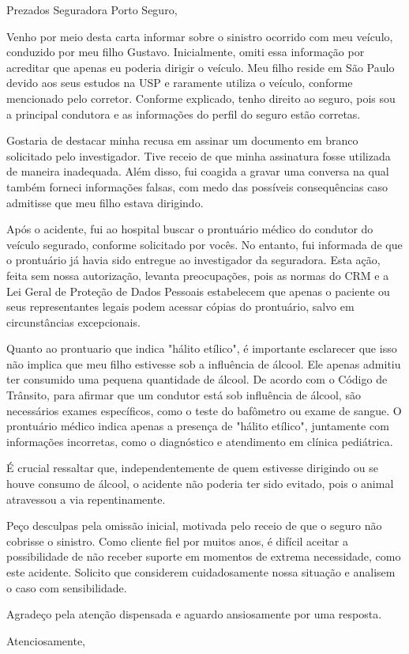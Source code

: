 \documentclass{letter}
\begin{document}
\begin{letter}{}

\opening{Prezados Seguradora Porto Seguro,}

Venho por meio desta carta informar sobre o sinistro ocorrido com meu veículo, conduzido por meu filho Gustavo. Inicialmente, omiti essa informação por acreditar que apenas eu poderia dirigir o veículo. Meu filho reside em São Paulo devido aos seus estudos na USP e raramente utiliza o veículo, conforme mencionado pelo corretor. Conforme explicado, tenho direito ao seguro, pois sou a principal condutora e as informações do perfil do seguro estão corretas.

Gostaria de destacar minha recusa em assinar um documento em branco solicitado pelo investigador. Tive receio de que minha assinatura fosse utilizada de maneira inadequada. Além disso, fui coagida a gravar uma conversa na qual também forneci informações falsas, com medo das possíveis consequências caso admitisse que meu filho estava dirigindo.

Após o acidente, fui ao hospital buscar o prontuário médico do condutor do veículo segurado, conforme solicitado por vocês. No entanto, fui informada de que o prontuário já havia sido entregue ao investigador da seguradora. Esta ação, feita sem nossa autorização, levanta preocupações, pois as normas do CRM e a Lei Geral de Proteção de Dados Pessoais estabelecem que apenas o paciente ou seus representantes legais podem acessar cópias do prontuário, salvo em circunstâncias excepcionais.

Quanto ao prontuario que indica "hálito etílico", é importante esclarecer que isso não implica que meu filho estivesse sob a influência de álcool. Ele apenas admitiu ter consumido uma pequena quantidade de álcool. De acordo com o Código de Trânsito, para afirmar que um condutor está sob influência de álcool, são necessários exames específicos, como o teste do bafômetro ou exame de sangue. O prontuário médico indica apenas a presença de "hálito etílico", juntamente com informações incorretas, como o diagnóstico e atendimento em clínica pediátrica. 

É crucial ressaltar que, independentemente de quem estivesse dirigindo ou se houve consumo de álcool, o acidente não poderia ter sido evitado, pois o animal atravessou a via repentinamente.

Peço desculpas pela omissão inicial, motivada pelo receio de que o seguro não cobrisse o sinistro. Como cliente fiel por muitos anos, é difícil aceitar a possibilidade de não receber suporte em momentos de extrema necessidade, como este acidente. Solicito que considerem cuidadosamente nossa situação e analisem o caso com sensibilidade.

Agradeço pela atenção dispensada e aguardo ansiosamente por uma resposta.

\closing{Atenciosamente,}


\end{letter}
\end{document}

